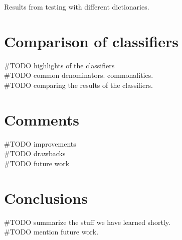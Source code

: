 Results from testing with different dictionaries. 

\section{Comparison of classifiers}
#TODO highlights of the classifiers \\
#TODO common denominators. commonalities.\\
#TODO comparing the results of the classifiers. \\

\section{Comments}
#TODO improvements \\
#TODO drawbacks \\
#TODO future work \\

\section{Conclusions}
#TODO summarize the stuff we have learned shortly. \\
#TODO mention future work. \\
